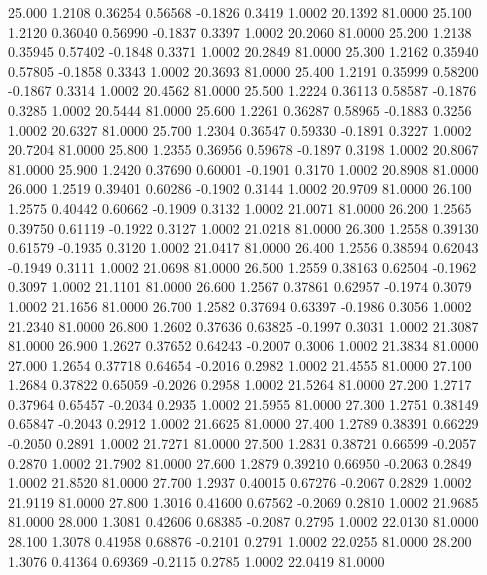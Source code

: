   25.000   1.2108   0.36254   0.56568  -0.1826   0.3419   1.0002  20.1392  81.0000
  25.100   1.2120   0.36040   0.56990  -0.1837   0.3397   1.0002  20.2060  81.0000
  25.200   1.2138   0.35945   0.57402  -0.1848   0.3371   1.0002  20.2849  81.0000
  25.300   1.2162   0.35940   0.57805  -0.1858   0.3343   1.0002  20.3693  81.0000
  25.400   1.2191   0.35999   0.58200  -0.1867   0.3314   1.0002  20.4562  81.0000
  25.500   1.2224   0.36113   0.58587  -0.1876   0.3285   1.0002  20.5444  81.0000
  25.600   1.2261   0.36287   0.58965  -0.1883   0.3256   1.0002  20.6327  81.0000
  25.700   1.2304   0.36547   0.59330  -0.1891   0.3227   1.0002  20.7204  81.0000
  25.800   1.2355   0.36956   0.59678  -0.1897   0.3198   1.0002  20.8067  81.0000
  25.900   1.2420   0.37690   0.60001  -0.1901   0.3170   1.0002  20.8908  81.0000
  26.000   1.2519   0.39401   0.60286  -0.1902   0.3144   1.0002  20.9709  81.0000
  26.100   1.2575   0.40442   0.60662  -0.1909   0.3132   1.0002  21.0071  81.0000
  26.200   1.2565   0.39750   0.61119  -0.1922   0.3127   1.0002  21.0218  81.0000
  26.300   1.2558   0.39130   0.61579  -0.1935   0.3120   1.0002  21.0417  81.0000
  26.400   1.2556   0.38594   0.62043  -0.1949   0.3111   1.0002  21.0698  81.0000
  26.500   1.2559   0.38163   0.62504  -0.1962   0.3097   1.0002  21.1101  81.0000
  26.600   1.2567   0.37861   0.62957  -0.1974   0.3079   1.0002  21.1656  81.0000
  26.700   1.2582   0.37694   0.63397  -0.1986   0.3056   1.0002  21.2340  81.0000
  26.800   1.2602   0.37636   0.63825  -0.1997   0.3031   1.0002  21.3087  81.0000
  26.900   1.2627   0.37652   0.64243  -0.2007   0.3006   1.0002  21.3834  81.0000
  27.000   1.2654   0.37718   0.64654  -0.2016   0.2982   1.0002  21.4555  81.0000
  27.100   1.2684   0.37822   0.65059  -0.2026   0.2958   1.0002  21.5264  81.0000
  27.200   1.2717   0.37964   0.65457  -0.2034   0.2935   1.0002  21.5955  81.0000
  27.300   1.2751   0.38149   0.65847  -0.2043   0.2912   1.0002  21.6625  81.0000
  27.400   1.2789   0.38391   0.66229  -0.2050   0.2891   1.0002  21.7271  81.0000
  27.500   1.2831   0.38721   0.66599  -0.2057   0.2870   1.0002  21.7902  81.0000
  27.600   1.2879   0.39210   0.66950  -0.2063   0.2849   1.0002  21.8520  81.0000
  27.700   1.2937   0.40015   0.67276  -0.2067   0.2829   1.0002  21.9119  81.0000
  27.800   1.3016   0.41600   0.67562  -0.2069   0.2810   1.0002  21.9685  81.0000
  28.000   1.3081   0.42606   0.68385  -0.2087   0.2795   1.0002  22.0130  81.0000
  28.100   1.3078   0.41958   0.68876  -0.2101   0.2791   1.0002  22.0255  81.0000
  28.200   1.3076   0.41364   0.69369  -0.2115   0.2785   1.0002  22.0419  81.0000
